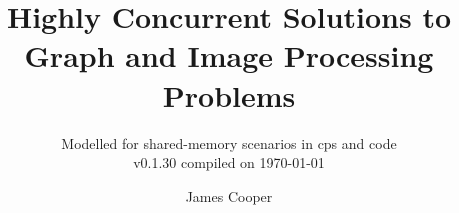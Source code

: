 \documentclass[newzealand,10pt,partial,onehalfspace]{aucklandthesis}
\theoremstyle{plain}
\begin{document}
\OnehalfSpacing
{}
\frontmatter

%
%
%

\title{Highly Concurrent Solutions to Graph and Image Processing Problems}
\subtitle{Modelled for shared-memory scenarios in \gls{cps} and code \\ {\small v0.1.30 compiled on \today}}
\author{James Cooper}

\maketitle





\cleardoublepage\tableofcontents
\cleardoublepage\listoffigures
\cleardoublepage\listoftables
\cleardoublepage\listofcprulesetfloats
\cleardoublepage\listofcpobjectsfloats
\cleardoublepage\listoffixmes
\cleardoublepage\printglossary
\cleardoublepage\printglossary[type=\acronymtype]


%
%
%
%
\end{document}
